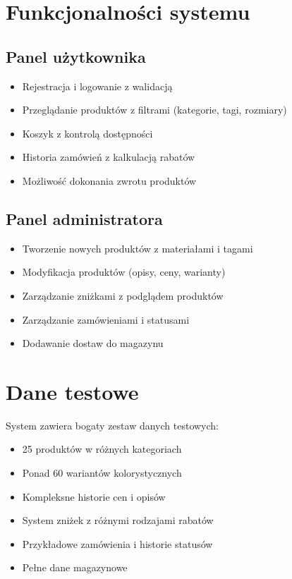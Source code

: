 \section*{Funkcjonalności systemu}

\subsection*{Panel użytkownika}
\begin{itemize}
    \item Rejestracja i logowanie z walidacją
    \item Przeglądanie produktów z filtrami (kategorie, tagi, rozmiary)
    \item Koszyk z kontrolą dostępności
    \item Historia zamówień z kalkulacją rabatów
    \item Możliwość dokonania zwrotu produktów
\end{itemize}

\subsection*{Panel administratora}
\begin{itemize}
    \item Tworzenie nowych produktów z materiałami i tagami
    \item Modyfikacja produktów (opisy, ceny, warianty)
    \item Zarządzanie zniżkami z podglądem produktów
    \item Zarządzanie zamówieniami i statusami
    \item Dodawanie dostaw do magazynu
\end{itemize}

\section*{Dane testowe}

System zawiera bogaty zestaw danych testowych:
\begin{itemize}
    \item 25 produktów w różnych kategoriach
    \item Ponad 60 wariantów kolorystycznych
    \item Kompleksne historie cen i opisów
    \item System zniżek z różnymi rodzajami rabatów
    \item Przykładowe zamówienia i historie statusów
    \item Pełne dane magazynowe
\end{itemize}

